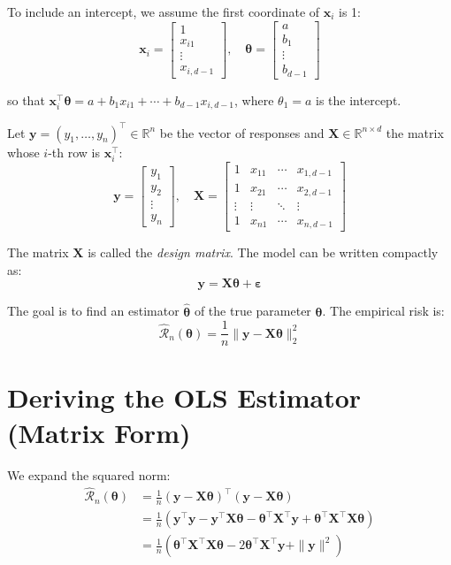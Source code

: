 \documentclass[main.tex]{subfiles}
\begin{document}
To include an intercept, we assume the first coordinate of $\mathbf{x}_i$ is 1:
$$\mathbf{x}_i = \begin{bmatrix} 1 \\ x_{i1} \\ \vdots \\ x_{i,d-1} \end{bmatrix}, \quad \boldsymbol{\theta} = \begin{bmatrix} a \\ b_1 \\ \vdots \\ b_{d-1} \end{bmatrix}$$

so that $\mathbf{x}_i^\top \boldsymbol{\theta} = a + b_1 x_{i1} + \cdots + b_{d-1} x_{i,d-1}$, where $\theta_1 = a$ is the intercept.

Let $\mathbf{y} = (y_1, \ldots, y_n)^\top \in \mathbb{R}^n$ be the vector of responses and $\mathbf{X} \in \mathbb{R}^{n \times d}$ the matrix whose $i$-th row is $\mathbf{x}_i^\top$:
$$\mathbf{y} = \begin{bmatrix} y_1 \\ y_2 \\ \vdots \\ y_n \end{bmatrix}, \quad \mathbf{X} = \begin{bmatrix} 1 & x_{11} & \cdots & x_{1,d-1} \\ 1 & x_{21} & \cdots & x_{2,d-1} \\ \vdots & \vdots & \ddots & \vdots \\ 1 & x_{n1} & \cdots & x_{n,d-1} \end{bmatrix}$$

The matrix $\mathbf{X}$ is called the \textit{design matrix}. The model can be written compactly as:
$$\mathbf{y} = \mathbf{X}\boldsymbol{\theta} + \boldsymbol{\varepsilon}$$

The goal is to find an estimator $\hat{\boldsymbol{\theta}}$ of the true parameter $\boldsymbol{\theta}$. The empirical risk is:
$$\hat{\mathcal{R}}_n(\boldsymbol{\theta}) = \frac{1}{n}\|\mathbf{y} - \mathbf{X}\boldsymbol{\theta}\|_2^2$$

\needspace{0.33\textheight}
\section{Deriving the OLS Estimator (Matrix Form)}

We expand the squared norm:
\begin{align}
\hat{\mathcal{R}}_n(\boldsymbol{\theta}) &= \frac{1}{n}(\mathbf{y} - \mathbf{X}\boldsymbol{\theta})^\top(\mathbf{y} - \mathbf{X}\boldsymbol{\theta}) \\[8pt]
&= \frac{1}{n}\left(\mathbf{y}^\top\mathbf{y} - \mathbf{y}^\top\mathbf{X}\boldsymbol{\theta} - \boldsymbol{\theta}^\top\mathbf{X}^\top\mathbf{y} + \boldsymbol{\theta}^\top\mathbf{X}^\top\mathbf{X}\boldsymbol{\theta}\right) \\[8pt]
&= \frac{1}{n}\left(\boldsymbol{\theta}^\top\mathbf{X}^\top\mathbf{X}\boldsymbol{\theta} - 2\boldsymbol{\theta}^\top\mathbf{X}^\top\mathbf{y} + \|\mathbf{y}\|^2\right)
\end{align}
\end{document}
